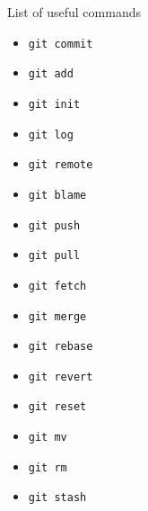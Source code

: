 \documentclass[10pt,aspectratio=169]{beamer}
\begin{document}
\begin{frame}[fragile]{List of useful commands}
    \begin{multicols}{2}
        \begin{itemize}
            \item \verb|git commit|
            \item \verb|git add|
            \item \verb|git init|
            \item \verb|git log|
            \item \verb|git remote|
            \item \verb|git blame|
            \item \verb|git push|
            \item \verb|git pull|
            \item \verb|git fetch|
            \item \verb|git merge|
            \item \verb|git rebase|
            \item \verb|git revert|
            \item \verb|git reset|
            \item \verb|git mv|
            \item \verb|git rm|
            \item \verb|git stash|
        \end{itemize}
    \end{multicols}
\end{frame}
\end{document}
